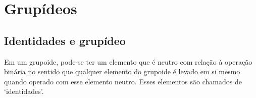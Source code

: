 \begin{comment}

\subsubsection{Homomorfismo de semigrupo}

\begin{definition}
Sejam $\bm G=(G,\opb)$ e $\bm G'=(G',\opb')$ semigrupos. Um \emph{homomorfismo de semigrupo} de $\bm G$ para $\bm G'$ é um homomorfismo de grupoide $\fun{h}{\bm G}{\bm G'}$. Denota-se $\fun{h}{\bm G}{\bm G'}$ e o conjunto de todos esses homomorfismos de semigrupo é denotado por $\Homo(\bm G,\bm G')$.
\end{definition}

\begin{proposition}[Composição de homomorfismos]
\label{prop:composicao.morfismo.semigrupo}
Sejam $\bm G=(G,\opb)$, $\bm G'=(G',\opb')$ e $\bm G''=(G'',\opb'')$ semigrupos e $\fun{h}{\bm G }{\bm G'}$ e $\fun{h'}{\bm G'}{\bm G''}$ homomorfismos de semigrupo. Então $\fun{h' \circ h}{\bm G}{\bm G''}$ é homomorfismo de semigrupo.
\end{proposition}
\begin{proof}
A mesma demonstração de \ref{prop:composicao.morfismo.grupoide}.
\end{proof}


\end{comment}

\section{Grupídeos}

\subsection{Identidades e grupídeo}

Em um grupoide, pode-se ter um elemento que é neutro com relação à operação binária no sentido que qualquer elemento do grupoide é levado em si mesmo quando operado com esse elemento neutro. Esses elementos são chamados de `identidades'.


